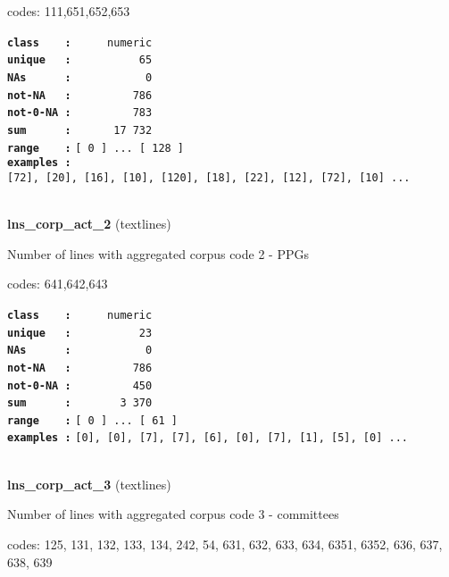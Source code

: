 \documentclass[]{article}
\begin{document}
codes: 111,651,652,653

\textbf{\texttt{class\ \ \ \ :}} \texttt{~~~~~numeric}\\
\textbf{\texttt{unique\ \ \ :}} \texttt{~~~~~~~~~~65}\\
\textbf{\texttt{NAs\ \ \ \ \ \ :}} \texttt{~~~~~~~~~~~0}\\
\textbf{\texttt{not-NA\ \ \ :}} \texttt{~~~~~~~~~786}\\
\textbf{\texttt{not-0-NA\ :}} \texttt{~~~~~~~~~783}\\
\textbf{\texttt{sum\ \ \ \ \ \ :}} \texttt{~~~~~~17~732}\\
\textbf{\texttt{range\ \ \ \ :}}
\texttt{{[}\ 0\ {]}\ ...\ {[}\ 128\ {]}}\\
\textbf{\texttt{examples\ :}}
\texttt{{[}72{]},\ {[}20{]},\ {[}16{]},\ {[}10{]},\ {[}120{]},\ {[}18{]},\ {[}22{]},\ {[}12{]},\ {[}72{]},\ {[}10{]}\ ...}\\

~

\textbf{lns\_corp\_act\_2} (textlines)

Number of lines with aggregated corpus code 2 - PPGs

codes: 641,642,643

\textbf{\texttt{class\ \ \ \ :}} \texttt{~~~~~numeric}\\
\textbf{\texttt{unique\ \ \ :}} \texttt{~~~~~~~~~~23}\\
\textbf{\texttt{NAs\ \ \ \ \ \ :}} \texttt{~~~~~~~~~~~0}\\
\textbf{\texttt{not-NA\ \ \ :}} \texttt{~~~~~~~~~786}\\
\textbf{\texttt{not-0-NA\ :}} \texttt{~~~~~~~~~450}\\
\textbf{\texttt{sum\ \ \ \ \ \ :}} \texttt{~~~~~~~3~370}\\
\textbf{\texttt{range\ \ \ \ :}}
\texttt{{[}\ 0\ {]}\ ...\ {[}\ 61\ {]}}\\
\textbf{\texttt{examples\ :}}
\texttt{{[}0{]},\ {[}0{]},\ {[}7{]},\ {[}7{]},\ {[}6{]},\ {[}0{]},\ {[}7{]},\ {[}1{]},\ {[}5{]},\ {[}0{]}\ ...}\\

~

\textbf{lns\_corp\_act\_3} (textlines)

Number of lines with aggregated corpus code 3 - committees

codes: 125, 131, 132, 133, 134, 242, 54, 631, 632, 633, 634, 6351, 6352,
636, 637, 638, 639
\end{document}

